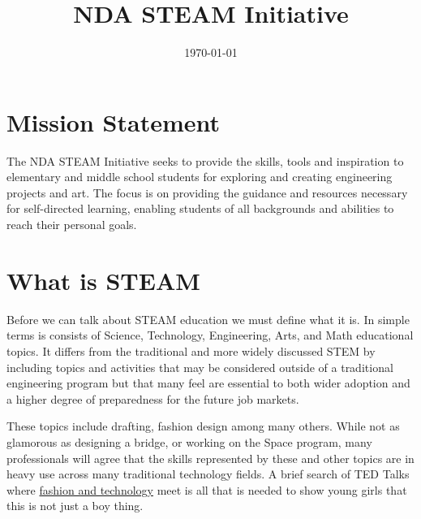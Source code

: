 \documentclass{article}
\begin{document}
%
%
\title{\textbf{NDA STEAM Initiative}}
\date{\today}

\clearpage\maketitle
\thispagestyle{empty}
\newpage

%
%

\section*{Mission Statement}
The NDA STEAM Initiative seeks to provide the skills, tools and inspiration to elementary and middle school students for exploring and creating engineering projects and art. The focus is on providing the guidance and resources necessary for self-directed learning, enabling students of all backgrounds and abilities to reach their personal goals.

\section*{What is STEAM}
Before we can talk about STEAM education we must define what it is. In simple terms is consists of Science, Technology, Engineering, Arts, and Math educational topics. It differs from the traditional and more widely discussed STEM by including topics and activities that may be considered outside of a traditional engineering program but that many feel are essential to both wider adoption and a higher degree of preparedness for the future job markets. 

These topics include drafting, fashion design among many others. While not as glamorous as designing a bridge, or working on the Space program, many professionals will agree that the skills represented by these and other topics are in heavy use across many traditional technology fields. A brief search of TED Talks where \href{https://tedxinnovations.ted.com/2016/08/26/eight-tedx-talks-that-are-always-in-fashion/}{fashion and technology} meet is all that is needed to show young girls that this is not just a boy thing.
\end{document}

